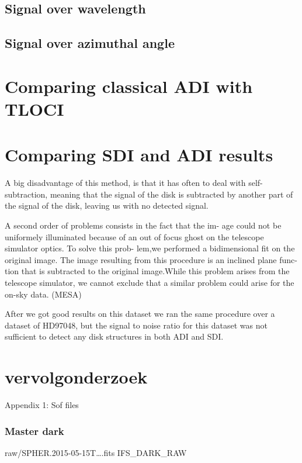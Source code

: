 \documentclass[twoside,single]{lion-msc}
\begin{document}
\subsection{Signal over wavelength}
\subsection{Signal over azimuthal angle}

\section{Comparing classical ADI with TLOCI}
\section{Comparing SDI and ADI results}



A big disadvantage of this method, is that it has often to deal with self-subtraction, meaning that the signal of the disk is subtracted by another part of the signal of the disk, leaving us with no detected signal.  



A second order of problems consists in the fact that the im-
age could not be uniformely illuminated because of an out of focus ghost on the telescope simulator optics. To solve this prob- lem,we performed a bidimensional fit on the original image. The image resulting from this procedure is an inclined plane func- tion that is subtracted to the original image.While this problem arises from the telescope simulator, we cannot exclude that a similar problem could arise for the on-sky data. (MESA)



After we got good results on this dataset we ran the same procedure over a dataset of HD97048, but the signal to noise ratio for this dataset was not sufficient to detect any disk structures in both ADI and SDI.
\section{vervolgonderzoek}

\clearpage
\huge{Appendix 1: Sof files}
\small
\subsubsection*{Master dark}
\begin{mdframed}[linewidth = 0.3mm, linecolor = black]
raw/SPHER.2015-05-15T\dots.fits IFS\_DARK\_RAW
\end{mdframed}
\end{document}
